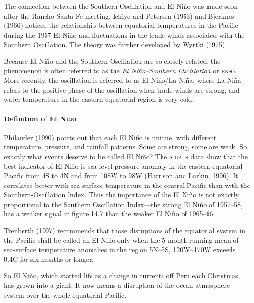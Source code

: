 The connection between the Southern Oscillation and El Ni\~{n}o was made soon after the Rancho Santa Fe
meeting. Ichiye and Petersen (1963) and Bjerknes (1966) noticed the
relationship between equatorial temperatures in the Pacific during the
1957 El Ni\~{n}o and fluctuations in the trade winds associated with
the Southern Oscillation. The theory was further developed by Wyrtki
(1975).

Because El Ni\~{n}o and the Southern Oscillation are so closely related, the phenomenon is often
referred to as the \textit{El Ni\~{n}o--Southern
  Oscillation} or \textsc{enso}. More recently, the
oscillation is referred to as El Ni\~{n}o/La Ni\~{n}a, where La
Ni\~{n}a refers to the positive phase of the oscillation when trade
winds are strong, and water temperature in the eastern equatorial
region is very cold.

\paragraph{Definition of El Ni\~{n}o}
Philander (1990) points out that each El
Ni\~{n}o is unique, with different temperature, pressure, and
rainfall patterns. Some are strong, some are
weak. So, exactly what events deserve to be called El Ni\~{n}o? The
\textsc{icoads} data show that the best indicator of El
Ni\~{n}o is sea-level pressure anomaly in the eastern equatorial
Pacific from 4\degrees S to 4\degrees N and from 108\degrees W to
98\degrees W (Harrison and Larkin, 1996). It correlates better with
sea-surface temperature in the central Pacific than with the
Southern-Oscillation Index. Thus the importance of the El Ni\~{n}o is
not exactly proportional to the Southern Oscillation
Index---the strong El Ni\~{n}o of
1957--58, has a weaker signal in figure 14.7 than the weaker El
Ni\~{n}o of 1965--66.

Trenberth (1997) recommends that those disruptions of the equatorial
system in the Pacific shall be called an El Ni\~{n}o only when the
5-month running mean of sea-surface temperature
anomalies in the region
5\degrees N--5\degrees S, 120\degrees W--170\degrees W exceeds
0.4\degrees C for six months or longer.

So El Ni\~{n}o, which started life as a change in currents off Peru
each Christmas, has grown into a giant. It now means a disruption of
the ocean-atmosphere system over the whole equatorial Pacific.

